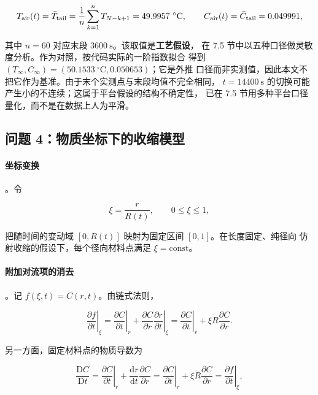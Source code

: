 \begin{equation}
\Tair(t)=\bar T_{\mathrm{tail}}=\frac{1}{n}\sum_{k=1}^{n}T_{N-k+1}=49.9957\ ^\circ\mathrm{C},\qquad
\Cair(t)=\bar C_{\mathrm{tail}}=0.049991,
\end{equation}

其中 $n=60$ 对应末段 $3600\ \mathrm{s}$。该取值是\textbf{工艺假设}，
在 7.5 节中以五种口径做灵敏度分析。作为对照，按代码实际的一阶指数拟合
得到 $(T_\infty,C_\infty)=(50.1533\ ^\circ\mathrm{C},0.050653)$；它是外推
口径而非实测值，因此本文不把它作为基准。由于末个实测点与末段均值不完全相同，
$t=14400\ \mathrm{s}$ 的切换可能产生小的不连续；这属于平台假设的结构不确定性，
已在 7.5 节用多种平台口径量化，而不是在数据上人为平滑。

\subsection{问题 4：物质坐标下的收缩模型}

\paragraph{坐标变换}。令

\begin{equation}
\xi=\frac{r}{R(t)},\qquad 0\le\xi\le1 ,
\end{equation}

把随时间的变动域 $[0,R(t)]$ 映射为固定区间 $[0,1]$。在长度固定、纯径向
仿射收缩的假设下，每个径向材料点满足 $\xi=\text{const}$。

\paragraph{附加对流项的消去}。记 $f(\xi,t)=C(r,t)$。由链式法则，

\begin{equation}
\left.\frac{\partial f}{\partial t}\right|_{\xi}
=\left.\frac{\partial C}{\partial t}\right|_{r}+\frac{\partial C}{\partial r}
\left.\frac{\partial r}{\partial t}\right|_{\xi}
=\left.\frac{\partial C}{\partial t}\right|_{r}
+\xi\dot R\frac{\partial C}{\partial r}.
\end{equation}

另一方面，固定材料点的物质导数为

\begin{equation}
\frac{\mathrm{D}C}{\mathrm{D}t}
=\left.\frac{\partial C}{\partial t}\right|_{r}
+\frac{\mathrm{d}r}{\mathrm{d}t}\frac{\partial C}{\partial r}
=\left.\frac{\partial C}{\partial t}\right|_{r}+\xi\dot R\frac{\partial C}{\partial r}
=\left.\frac{\partial f}{\partial t}\right|_{\xi},
\end{equation}

